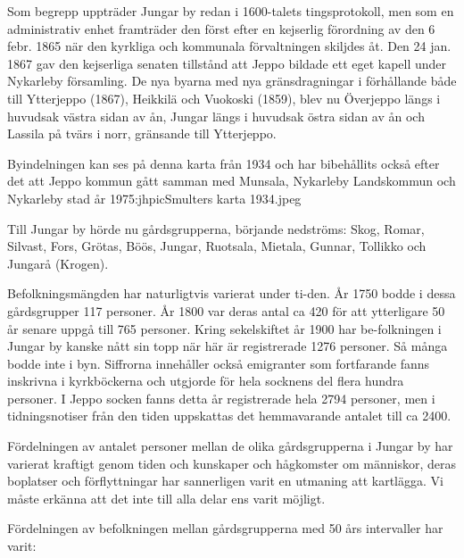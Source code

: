 Som begrepp uppträder Jungar by redan i 1600-talets tingsprotokoll, men som en administrativ enhet framträder den först efter en kejserlig förordning av den 6 febr. 1865 när den kyrkliga och kommunala förvaltningen skiljdes åt. Den 24 jan. 1867 gav den kejserliga senaten tillstånd att Jeppo bildade ett eget kapell under Nykarleby församling. De nya byarna med nya gränsdragningar i förhållande både till Ytterjeppo (1867), Heikkilä och Vuokoski (1859), blev nu Överjeppo längs i huvudsak västra sidan av ån, Jungar längs i huvudsak östra sidan av ån och Lassila på tvärs i norr, gränsande till Ytterjeppo.

Byindelningen kan ses på denna karta från 1934 och har bibehållits också efter det att Jeppo kommun gått samman med Munsala, Nykarleby Landskommun och Nykarleby stad år 1975:jhpic{Smulters karta 1934.jpeg}

Till Jungar by hörde nu gårdsgrupperna, börjande nedströms: Skog, Romar, Silvast, Fors, Grötas, Böös, Jungar, Ruotsala, Mietala, Gunnar, Tollikko och Jungarå (Krogen).

Befolkningsmängden har naturligtvis varierat under ti-den. År 1750 bodde i dessa gårdsgrupper 117 personer. År 1800 var deras antal ca 420 för att ytterligare 50 år senare uppgå till 765 personer. Kring sekelskiftet år 1900 har be-folkningen i Jungar by kanske nått sin topp när här är registrerade 1276 personer.  Så många bodde inte i byn. Siffrorna innehåller också emigranter som fortfarande fanns inskrivna i kyrkböckerna och utgjorde för hela socknens del flera hundra personer. I Jeppo socken fanns detta år registrerade hela 2794  personer, men i tidningsnotiser från den tiden uppskattas det hemmavarande antalet till ca 2400.

Fördelningen av antalet personer mellan de olika gårdsgrupperna i Jungar by har varierat kraftigt genom tiden och kunskaper och hågkomster om människor, deras boplatser och förflyttningar har sannerligen varit en utmaning att kartlägga. Vi måste erkänna att det inte till alla delar ens varit möjligt.

Fördelningen av befolkningen mellan gårdsgrupperna med 50 års intervaller har varit:

